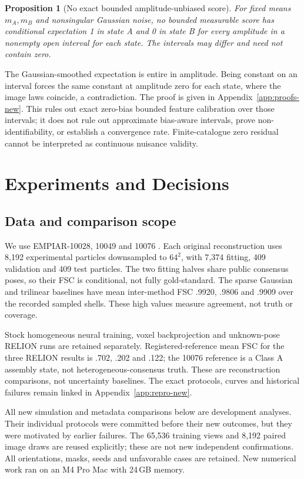 \documentclass{article}
\newtheorem{proposition}{Proposition}
\begin{document}
\begin{proposition}[No exact bounded amplitude-unbiased score]
\label{prop:amplitude-new}
For fixed means $m_A,m_B$ and nonsingular Gaussian noise, no bounded
measurable score has conditional expectation 1 in state A and 0 in state B
for every amplitude in a nonempty open interval for each state. The
intervals may differ and need not contain zero.
\end{proposition}
The Gaussian-smoothed expectation is entire in amplitude. Being constant
on an interval forces the same constant at amplitude zero for each state,
where the image laws coincide, a contradiction. The proof is given in
Appendix~\ref{app:proofs-new}. This rules out exact zero-bias bounded
feature calibration over those intervals; it does not rule out approximate
bias-aware intervals, prove non-identifiability, or establish a convergence
rate. Finite-catalogue zero residual cannot be interpreted as continuous
nuisance validity.

\section{Experiments and Decisions}
\subsection{Data and comparison scope}
We use EMPIAR-10028, 10049 and 10076
\citep{empiar10028,empiar10049,empiar10076}. Each original reconstruction
uses 8,192 experimental particles downsampled to $64^2$, with 7,374 fitting,
409 validation and 409 test particles. The two fitting halves share public
consensus poses, so their FSC is conditional, not fully gold-standard.
The sparse Gaussian and trilinear baselines have mean inter-method FSC
.9920, .9806 and .9909 over the recorded sampled shells. These high values
measure agreement, not truth or coverage.

Stock homogeneous neural training, voxel backprojection and unknown-pose
RELION runs are retained separately. Registered-reference mean FSC for the
three RELION results is .702, .202 and .122; the 10076 reference is a Class A
assembly state, not heterogeneous-consensus truth. These are reconstruction
comparisons, not uncertainty baselines. The exact protocols, curves and
historical failures remain linked in Appendix~\ref{app:repro-new}.

All new simulation and metadata comparisons below are development analyses.
Their individual protocols were committed before their new outcomes, but
they were motivated by earlier failures. The 65,536 training views and
8,192 paired image draws are reused explicitly; these are not new independent
confirmations. All orientations, masks, seeds and unfavorable cases are
retained. New numerical work ran on an M4 Pro Mac with 24\,GB memory.
\end{document}
